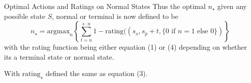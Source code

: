 \documentclass{beamer}
\begin{document}
\begin{frame}{Optimal Actions and Ratings on Normal States}
    Thus the optimal $n_{\star}$ given any possible state $S$, normal or terminal is now defined to be
    $$
    n_{\star} = \text{argmax}_{n} \left\{\sum_{t = n}^{s \cdot n} 1 - \text{rating}((s_o, s_p + t, \{0 \text{ if } n = 1 \text{ else } 0\}) \right\}
    $$
    with the rating function being either equation (1) or (4) depending on whether its a terminal state or normal state.

    With $\text{rating}_{\star}$ defined the same as equation (3).
\end{frame}



\begin{frame}
    
\end{frame}
\end{document}

